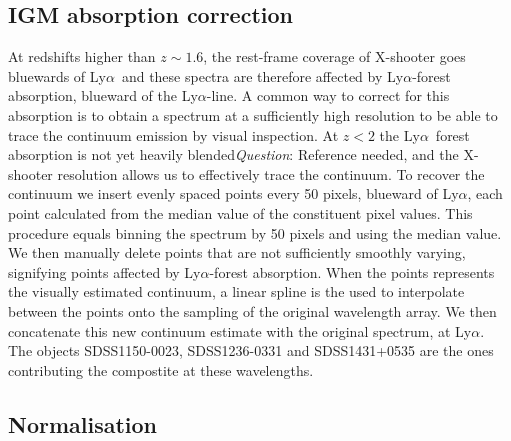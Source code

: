 \documentclass{aa}    %
\newcommand{\sectlabel}[1]{\label{sect:#1}}
\newcommand{\lya}{Ly$\alpha$}
\newcommand{\todo}[3]{{\color{#2}\emph{#1}: #3}}
\newcommand{\qtodo}[1]{\todo{Question}{red}{#1}}
\begin{document}
\subsection{IGM absorption correction} \sectlabel{igm}

At redshifts higher than $z\sim1.6$, the rest-frame coverage of X-shooter goes bluewards of \lya~and these spectra are therefore affected by \lya-forest absorption, blueward of the \lya-line. A common way to correct for this absorption is to obtain a spectrum at a sufficiently high resolution to be able to trace the continuum emission by visual inspection. At $z < 2 $ the \lya~forest absorption is not yet heavily blended\qtodo{Reference needed}, and the X-shooter resolution allows us to effectively trace the continuum. To recover the continuum we insert evenly spaced points every 50 pixels, blueward of \lya, each point calculated from the median value of the constituent pixel values. This procedure equals binning the spectrum by 50 pixels and using the median value. We then manually delete points that are not sufficiently smoothly varying, signifying points affected by \lya-forest absorption. When the points represents the visually estimated continuum, a linear spline is the used to interpolate between the points onto the sampling of the original wavelength array. We then concatenate this new continuum estimate with the original spectrum, at \lya. The objects SDSS1150-0023, SDSS1236-0331 and SDSS1431+0535 are the ones contributing the compostite at these wavelengths. 


\subsection{Normalisation}  \sectlabel{norm}
\end{document}
